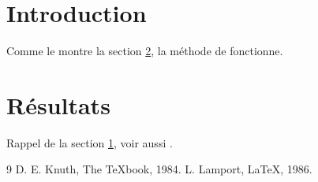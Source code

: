 \documentclass{article}
\begin{document}
\hsize=380pt
\section{Introduction}\label{sec:intro}
Comme le montre la section \ref{sec:res}, la m\'ethode de \cite{knuth} fonctionne.
\section{R\'esultats}\label{sec:res}
Rappel de la section \ref{sec:intro}, voir aussi \cite{knuth,lamport}.
\begin{thebibliography}{9}
 D. E. Knuth, The TeXbook, 1984.
 L. Lamport, LaTeX, 1986.
\end{thebibliography}
\end{document}
